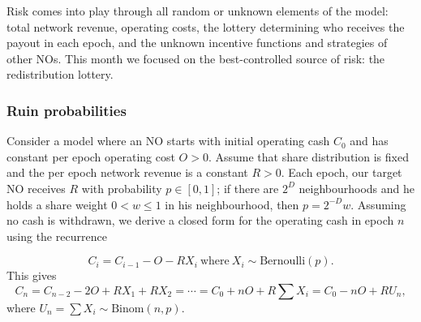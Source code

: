Risk comes into play through all random or unknown elements of the model: total network revenue, operating costs, the lottery determining who receives the payout in each epoch, and the unknown incentive functions and strategies of other NOs.
%
This month we focused on the best-controlled source of risk: the redistribution lottery.

\begin{comment}
\subsubsection*{Redistribution lottery structure}
 
A risk factor that is straightforwardly under the direct control of the system is the structure of the redistribution lottery.
%
Currently, in each epoch the full redistribution payout is awarded to a single NO with probability weighted by the number of bins and the NO share within the target bin.
%
Clearly, such an approach has higher variance than the expectation-equivalent deterministic system, which doles out a share of the payout weighted by the number of bins and bin share with probability $1$.

The random approach saves on computational costs by reducing the number of transfers that must be made in each epoch.
%
On the other hand, it introduces a risk of drawdowns and bankruptcy that especially affects smaller scale NOs, who may experience long strings of epochs without receiving any payout.
\end{comment}

\subsubsection*{Ruin probabilities}

Consider a model where an NO starts with initial operating cash $C_0$ and has constant per epoch operating cost $O>0$.
%
Assume that share distribution is fixed and the per epoch network revenue is a constant $R>0$.
%
Each epoch, our target NO receives $R$ with probability $p\in[0,1]$; if there are $2^D$ neighbourhoods and he holds a share weight $0<w\leq 1$ in his neighbourhood, then $p=2^{-D}w$.
%
Assuming no cash is withdrawn, we derive a closed form for the operating cash in epoch $n$ using the recurrence

\[
  C_i = C_{i-1} - O - RX_i~ \text{where}~ X_i \sim \mathrm{Bernoulli}(p).
\]
This gives 
\[
  C_n = C_{n-2} - 2O + RX_1 + RX_2 = \cdots = C_0 + nO + R\sum X_i = C_0 - nO + RU_n,
\]
where $U_n = \sum X_i \sim \mathrm{Binom}(n,p)$.

